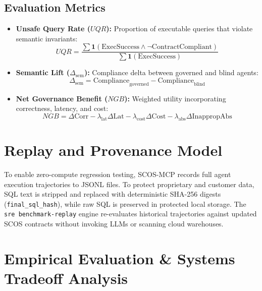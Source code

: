 \documentclass[11pt,a4paper]{article}
\begin{document}
\subsection{Evaluation Metrics}
\begin{itemize}[noitemsep]
    \item \textbf{Unsafe Query Rate ($UQR$):} Proportion of executable queries that violate semantic invariants:
    \begin{equation}
    UQR = \frac{\sum \mathbf{1}(\text{ExecSuccess} \land \neg \text{ContractCompliant})}{\sum \mathbf{1}(\text{ExecSuccess})}
    \end{equation}
    \item \textbf{Semantic Lift ($\Delta_{\text{sem}}$):} Compliance delta between governed and blind agents:
    \begin{equation}
    \Delta_{\text{sem}} = \text{Compliance}_{\text{governed}} - \text{Compliance}_{\text{blind}}
    \end{equation}
    \item \textbf{Net Governance Benefit ($NGB$):} Weighted utility incorporating correctness, latency, and cost:
    \begin{equation}
    NGB = \Delta \text{Corr} - \lambda_{\text{lat}}\Delta \text{Lat} - \lambda_{\text{cost}}\Delta \text{Cost} - \lambda_{\text{abs}}\Delta \text{InappropAbs}
    \end{equation}
\end{itemize}

\section{Replay and Provenance Model}
\label{sec:replay}

To enable zero-compute regression testing, SCOS-MCP records full agent execution trajectories to JSONL files. To protect proprietary and customer data, SQL text is stripped and replaced with deterministic SHA-256 digests (\texttt{final\_sql\_hash}), while raw SQL is preserved in protected local storage. The \texttt{sre benchmark-replay} engine re-evaluates historical trajectories against updated SCOS contracts without invoking LLMs or scanning cloud warehouses.

\section{Empirical Evaluation \& Systems Tradeoff Analysis}
\label{sec:results}
\end{document}
